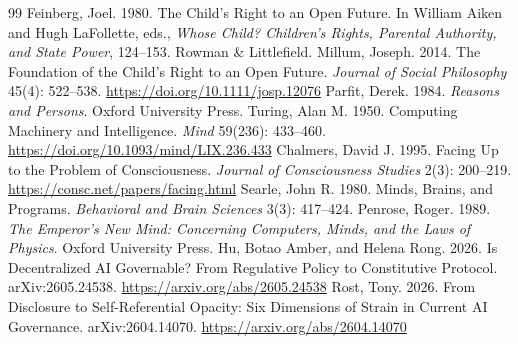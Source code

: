 \documentclass[11pt,a4paper]{article}
\begin{document}
\begin{thebibliography}{99}
Feinberg, Joel. 1980. The Child's Right to an Open Future. In William Aiken and Hugh LaFollette, eds., \emph{Whose Child? Children's Rights, Parental Authority, and State Power}, 124--153. Rowman \& Littlefield.
Millum, Joseph. 2014. The Foundation of the Child's Right to an Open Future. \emph{Journal of Social Philosophy} 45(4): 522--538. \url{https://doi.org/10.1111/josp.12076}
Parfit, Derek. 1984. \emph{Reasons and Persons}. Oxford University Press.
Turing, Alan M. 1950. Computing Machinery and Intelligence. \emph{Mind} 59(236): 433--460. \url{https://doi.org/10.1093/mind/LIX.236.433}
Chalmers, David J. 1995. Facing Up to the Problem of Consciousness. \emph{Journal of Consciousness Studies} 2(3): 200--219. \url{https://consc.net/papers/facing.html}
Searle, John R. 1980. Minds, Brains, and Programs. \emph{Behavioral and Brain Sciences} 3(3): 417--424.
Penrose, Roger. 1989. \emph{The Emperor's New Mind: Concerning Computers, Minds, and the Laws of Physics}. Oxford University Press.
Hu, Botao Amber, and Helena Rong. 2026. Is Decentralized AI Governable? From Regulative Policy to Constitutive Protocol. arXiv:2605.24538. \url{https://arxiv.org/abs/2605.24538}
Rost, Tony. 2026. From Disclosure to Self-Referential Opacity: Six Dimensions of Strain in Current AI Governance. arXiv:2604.14070. \url{https://arxiv.org/abs/2604.14070}
\end{thebibliography}
\end{document}
